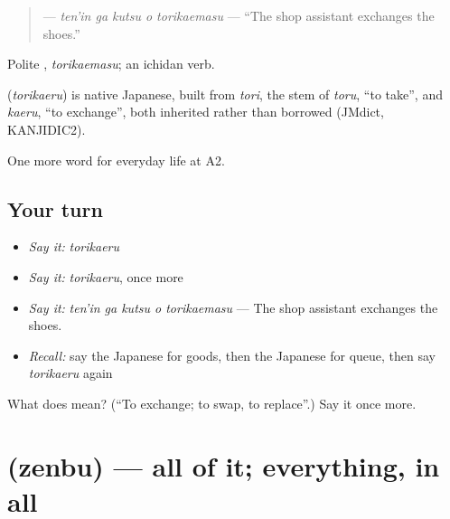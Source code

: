 \begin{quote}
\textbf{  } — \emph{ten'in ga kutsu o torikaemasu} — \textquotedblleft{}The shop assistant exchanges the shoes.\textquotedblright{}
\end{quote}

Polite \textbf{}, \emph{torikaemasu}; an ichidan verb.

\begin{cousinweb}
\textbf{} (\emph{torikaeru}) is native Japanese, built from \emph{tori}, the stem of \emph{toru}, \textquotedblleft{}to take\textquotedblright{}, and \emph{kaeru}, \textquotedblleft{}to exchange\textquotedblright{}, both inherited rather than borrowed (JMdict, KANJIDIC2).
\end{cousinweb}

\begin{grammarlens}[title={What you've built}]
One more word for everyday life at A2.
\end{grammarlens}

\subsection*{Your turn}
\begin{itemize}
\raggedright
  \item \emph{Say it:} \emph{torikaeru}
  \item \emph{Say it:} \emph{torikaeru}, once more
  \item \emph{Say it:} \emph{ten'in ga kutsu o torikaemasu} — The shop assistant exchanges the shoes.
  \item \emph{Recall:} say the Japanese for goods, then the Japanese for queue, then say \emph{torikaeru} again
\end{itemize}

\begin{tcolorbox}[breakable,colback=teal!4,colframe=teal!35!black,title={Before you move on}]
What does  mean? (\textquotedblleft{}To exchange; to swap, to replace\textquotedblright{}.) Say it once more.
\end{tcolorbox}
\section[\texorpdfstring{\ja{ぜんぶ} (zenbu)}{ぜんぶ (zenbu)}]{ (zenbu) — all of it; everything, in all}

\label{lesson:JA-C184-zenbu}



